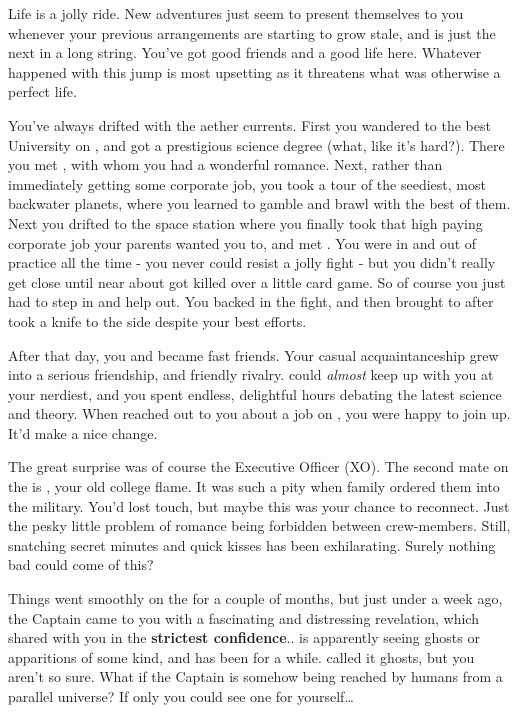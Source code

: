 \documentclass[char]{TMFHope}
\begin{document}
\name{\cSci{}}

Life is a jolly ride. New adventures just seem to present themselves to you whenever your previous arrangements are starting to grow stale, and \pNew{} is just the next in a long string. You've got good friends and a good life here. Whatever happened with this jump is most upsetting as it threatens what was otherwise a perfect life.

You've always drifted with the aether currents. First you wandered to the best University on \pHome{}, and got a prestigious science degree (what, like it's hard?). There you met \cXO{\full}, with whom you had a wonderful romance. Next, rather than immediately getting some corporate job, you took a tour of the seediest, most backwater \pEdge{} planets, where you learned to gamble and brawl with the best of them. Next you drifted to the space station where you finally took that high paying corporate job your parents wanted you to, and met \cMed{\full}. You were in and out of \cMed{\their} practice all the time - you never could resist a jolly fight - but you didn't really get close until \cCap{\full} near about got \cCap{\themself} killed over a little card game. So of course you just had to step in and help \cCap{\them} out. You backed \cCap{} in the fight, and then brought \cCap{\them} to \cMed{} after \cCap{\they} took a knife to the side despite your best efforts. 

After that day, you and \cMed{} became fast friends. Your casual acquaintanceship grew into a serious friendship, and friendly rivalry. \cMed{} could \emph{almost} keep up with you at your nerdiest, and you spent endless, delightful hours debating the latest science and theory. When \cCap{} reached out to you about a job on \pNew{}, you were happy to join up. It'd make a nice change.

The great surprise was of course the Executive Officer (XO). The second mate on the \pNew{} is \cXO{}, your old college flame. It was such a pity when \cXO{\their} family ordered them into the military. You'd lost touch, but maybe this was your chance to reconnect. Just the pesky little problem of romance being forbidden between crew-members. Still, snatching secret minutes and quick kisses has been exhilarating. Surely nothing bad could come of this?

Things went smoothly on the \pNew{} for a couple of months, but just under a week ago, the Captain came to you with a fascinating and distressing revelation, which \cCap{\they} shared with you in the \textbf{strictest confidence}.. \cCap{} is apparently seeing ghosts or apparitions of some kind, and has been for a while. \cCap{\They} called it ghosts, but you aren't so sure. What if the Captain is somehow being reached by humans from a parallel universe? If only you could see one for yourself\ldots
\end{document}
